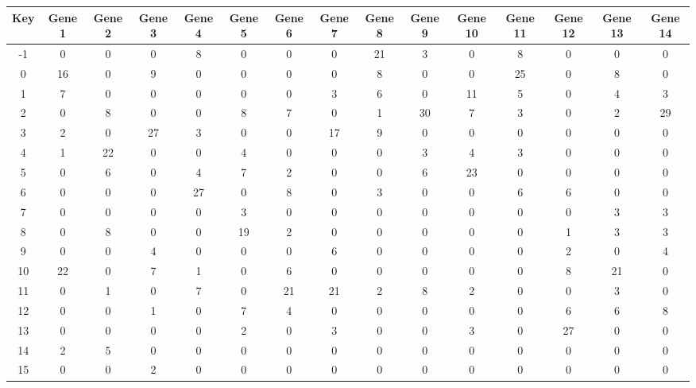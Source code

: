 \begin{tabular}{|c|c|c|c|c|c|c|c|c|c|c|c|c|c|c|}
\hline
Key & Gene 1 & Gene 2 & Gene 3 & Gene 4 & Gene 5 & Gene 6 & Gene 7 & Gene 8 & Gene 9 & Gene 10 & Gene 11 & Gene 12 & Gene 13 & Gene 14 \\
\hline
-1 & 0 & 0 & 0 & 8 & 0 & 0 & 0 & 21 & 3 & 0 & 8 & 0 & 0 & 0 \\
0 & 16 & 0 & 9 & 0 & 0 & 0 & 0 & 8 & 0 & 0 & 25 & 0 & 8 & 0 \\
1 & 7 & 0 & 0 & 0 & 0 & 0 & 3 & 6 & 0 & 11 & 5 & 0 & 4 & 3 \\
2 & 0 & 8 & 0 & 0 & 8 & 7 & 0 & 1 & 30 & 7 & 3 & 0 & 2 & 29 \\
3 & 2 & 0 & 27 & 3 & 0 & 0 & 17 & 9 & 0 & 0 & 0 & 0 & 0 & 0 \\
4 & 1 & 22 & 0 & 0 & 4 & 0 & 0 & 0 & 3 & 4 & 3 & 0 & 0 & 0 \\
5 & 0 & 6 & 0 & 4 & 7 & 2 & 0 & 0 & 6 & 23 & 0 & 0 & 0 & 0 \\
6 & 0 & 0 & 0 & 27 & 0 & 8 & 0 & 3 & 0 & 0 & 6 & 6 & 0 & 0 \\
7 & 0 & 0 & 0 & 0 & 3 & 0 & 0 & 0 & 0 & 0 & 0 & 0 & 3 & 3 \\
8 & 0 & 8 & 0 & 0 & 19 & 2 & 0 & 0 & 0 & 0 & 0 & 1 & 3 & 3 \\
9 & 0 & 0 & 4 & 0 & 0 & 0 & 6 & 0 & 0 & 0 & 0 & 2 & 0 & 4 \\
10 & 22 & 0 & 7 & 1 & 0 & 6 & 0 & 0 & 0 & 0 & 0 & 8 & 21 & 0 \\
11 & 0 & 1 & 0 & 7 & 0 & 21 & 21 & 2 & 8 & 2 & 0 & 0 & 3 & 0 \\
12 & 0 & 0 & 1 & 0 & 7 & 4 & 0 & 0 & 0 & 0 & 0 & 6 & 6 & 8 \\
13 & 0 & 0 & 0 & 0 & 2 & 0 & 3 & 0 & 0 & 3 & 0 & 27 & 0 & 0 \\
14 & 2 & 5 & 0 & 0 & 0 & 0 & 0 & 0 & 0 & 0 & 0 & 0 & 0 & 0 \\
15 & 0 & 0 & 2 & 0 & 0 & 0 & 0 & 0 & 0 & 0 & 0 & 0 & 0 & 0 \\
\hline
\end{tabular}